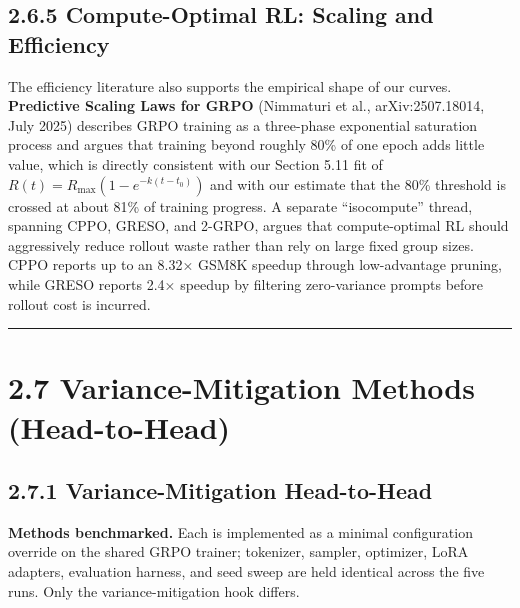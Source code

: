 \documentclass[
  american,
  11pt,
  a4paper,
  oneside]{report}
\begin{document}
\subsection{2.6.5 Compute-Optimal RL: Scaling and
Efficiency}\label{compute-optimal-rl-scaling-and-efficiency}

The efficiency literature also supports the empirical shape of our
curves. \textbf{Predictive Scaling Laws for GRPO} (Nimmaturi et al.,
arXiv:2507.18014, July 2025) describes GRPO training as a three-phase
exponential saturation process and argues that training beyond roughly
80\% of one epoch adds little value, which is directly consistent with
our Section 5.11 fit of \(R(t)=R_{\max}(1-e^{-k(t-t_0)})\) and with our
estimate that the 80\% threshold is crossed at about 81\% of training
progress. A separate ``isocompute'' thread, spanning CPPO, GRESO, and
2-GRPO, argues that compute-optimal RL should aggressively reduce
rollout waste rather than rely on large fixed group sizes. CPPO reports
up to an 8.32× GSM8K speedup through low-advantage pruning, while GRESO
reports 2.4× speedup by filtering zero-variance prompts before rollout
cost is incurred.

\begin{center}\rule{0.5\linewidth}{0.5pt}\end{center}

\section{2.7 Variance-Mitigation Methods
(Head-to-Head)}\label{variance-mitigation-methods-head-to-head}

\subsection{2.7.1 Variance-Mitigation
Head-to-Head}\label{variance-mitigation-head-to-head}

\textbf{Methods benchmarked.} Each is implemented as a minimal
configuration override on the shared GRPO trainer; tokenizer, sampler,
optimizer, LoRA adapters, evaluation harness, and seed sweep are held
identical across the five runs. Only the variance-mitigation hook
differs.
\end{document}
